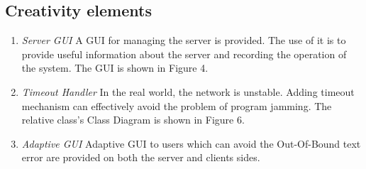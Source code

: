 \documentclass[a4paper]{article}
\begin{document}
\subsection{Creativity elements}
\begin{enumerate}
\item \textit{Server GUI}
A GUI for managing the server is provided. The use of it is to provide useful information about the server and recording the operation of the system. The GUI is shown in Figure 4.

\item \textit{Timeout Handler}
In the real world, the network is unstable. Adding timeout mechanism can effectively avoid the problem of program jamming. The relative class's Class Diagram is shown in Figure 6.

\item \textit{Adaptive GUI}
Adaptive GUI to users which can avoid the Out-Of-Bound text error are provided on both the server and clients sides. 

\end{enumerate}
\end{document}

